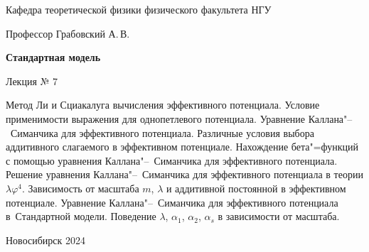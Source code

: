 \documentclass[12pt,pagesize,paper=192mm:108mm,landscape]{scrbook}
\begin{document}
\begin{titlepage}
\begin{center}
    Кафедра теоретической физики физического факультета НГУ
    \medskip

    \Large
    Профессор Грабовский А.\,В.
    \smallskip

    \huge
    \textbf{Стандартная модель}
    \smallskip

    \Large
    Лекция № 7
    \vfill

    \normalsize
    \begin{minipage}{0.9\linewidth}
      Метод Ли и Сциакалуга вычисления эффективного
      потенциала. Условие применимости выражения для однопетлевого
      потенциала. Уравнение Каллана"--~Симанчика для эффективного
      потенциала. Различные условия выбора аддитивного слагаемого в
      эффективном потенциале. Нахождение бета"=функций с помощью
      уравнения Каллана"--~Симанчика для эффективного потенциала. Решение
      уравнения Каллана"--~Симанчика для эффективного потенциала в теории
      $\lambda\varphi^4$. Зависимость от масштаба $m$, $\lambda$ и аддитивной постоянной в
      эффективном потенциале. Уравнение Каллана"--~Симанчика для
      эффективного потенциала в~Стандартной модели. Поведение $\lambda$, $\alpha_1$,
      $\alpha_2$, $\alpha_s$ в зависимости от масштаба.
    \end{minipage}
    \vfill

    \normalsize \ccbysa\hspace{0.5em}  Новосибирск 2024
  \end{center}
\end{titlepage}
\end{document}
